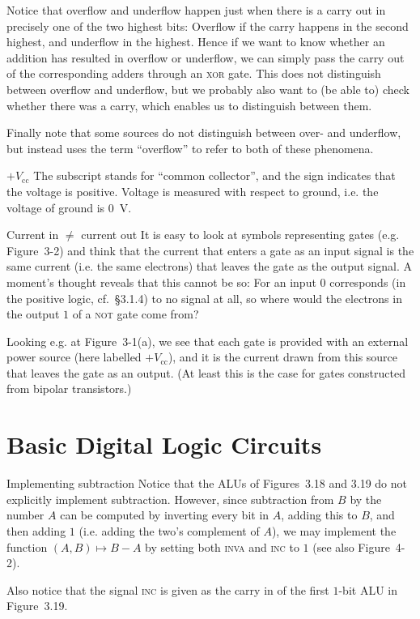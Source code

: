 \documentclass[article, a4paper, 11pt, oneside]{memoir}
\numberwithin{equation}{chapter}
\newcommand{\gate}{\textsc}
\newcommand{\gateNOT}{\gate{not}}
\newcommand{\gateXOR}{\gate{xor}}
\newcounter{desccount}
\begin{document}
\begin{notelist}
Notice that overflow and underflow happen just when there is a carry out in precisely one of the two highest bits: Overflow if the carry happens in the second highest, and underflow in the highest. Hence if we want to know whether an addition has resulted in overflow or underflow, we can simply pass the carry out of the corresponding adders through an \gateXOR{} gate. This does not distinguish between overflow and underflow, but we probably also want to (be able to) check whether there was a carry, which enables us to distinguish between them.

Finally note that some sources do not distinguish between over- and underflow, but instead uses the term \enquote{overflow} to refer to both of these phenomena.

\item[$+V_{\mathrm{cc}}$]
The subscript stands for \enquote{common collector}, and the sign indicates that the voltage is positive. Voltage is measured with respect to ground, i.e. the voltage of ground is \SI{0}{\volt}.

\item[Current in $\neq$ current out]\label{note:current-in-out} %
It is easy to look at symbols representing gates (e.g. Figure~3-2) and think that the current that enters a gate as an input signal is the same current (i.e. the same electrons) that leaves the gate as the output signal. A moment's thought reveals that this cannot be so: For an input $0$ corresponds (in the positive logic, cf.~§3.1.4) to no signal at all, so where would the electrons in the output $1$ of a \gateNOT{} gate come from?

Looking e.g. at Figure~3-1(a), we see that each gate is provided with an external power source (here labelled $+V_{\mathrm{cc}}$), and it is the current drawn from this source that leaves the gate as an output. (At least this is the case for gates constructed from bipolar transistors.)
\end{notelist}


\section{Basic Digital Logic Circuits}

\begin{notelist}
\item[Implementing subtraction]
Notice that the ALUs of Figures~3.18 and 3.19 do not explicitly implement subtraction. However, since subtraction from $B$ by the number $A$ can be computed by inverting every bit in $A$, adding this to $B$, and then adding $1$ (i.e. adding the two's complement of $A$), we may implement the function $(A,B) \mapsto B - A$ by setting both \textsc{inva} and \textsc{inc} to $1$ (see also Figure~4-2).

Also notice that the signal \textsc{inc} is given as the carry in of the first $1$-bit ALU in Figure~3.19.
\end{notelist}
\end{document}
